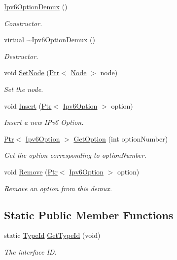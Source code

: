 \begin{DoxyCompactItemize}
\item 
\hyperlink{classns3_1_1Ipv6OptionDemux_a24eda18f711bb1626e93b85cad2894b3}{Ipv6\+Option\+Demux} ()
\begin{DoxyCompactList}\small\item\em Constructor. \end{DoxyCompactList}\item 
virtual \hyperlink{classns3_1_1Ipv6OptionDemux_a2fafb4a70d47e1aa7adf21932a611cb3}{$\sim$\+Ipv6\+Option\+Demux} ()
\begin{DoxyCompactList}\small\item\em Destructor. \end{DoxyCompactList}\item 
void \hyperlink{classns3_1_1Ipv6OptionDemux_a3a3c989fe7fb5f42b32ea435db753def}{Set\+Node} (\hyperlink{classns3_1_1Ptr}{Ptr}$<$ \hyperlink{classns3_1_1Node}{Node} $>$ node)
\begin{DoxyCompactList}\small\item\em Set the node. \end{DoxyCompactList}\item 
void \hyperlink{classns3_1_1Ipv6OptionDemux_a2e521d7d6f94ec7f486f433212543f62}{Insert} (\hyperlink{classns3_1_1Ptr}{Ptr}$<$ \hyperlink{classns3_1_1Ipv6Option}{Ipv6\+Option} $>$ option)
\begin{DoxyCompactList}\small\item\em Insert a new I\+Pv6 Option. \end{DoxyCompactList}\item 
\hyperlink{classns3_1_1Ptr}{Ptr}$<$ \hyperlink{classns3_1_1Ipv6Option}{Ipv6\+Option} $>$ \hyperlink{classns3_1_1Ipv6OptionDemux_ae7f858926a2c88165e4b4ce2975d12c6}{Get\+Option} (int option\+Number)
\begin{DoxyCompactList}\small\item\em Get the option corresponding to option\+Number. \end{DoxyCompactList}\item 
void \hyperlink{classns3_1_1Ipv6OptionDemux_aae6a6d75f141074047d169a2e342d938}{Remove} (\hyperlink{classns3_1_1Ptr}{Ptr}$<$ \hyperlink{classns3_1_1Ipv6Option}{Ipv6\+Option} $>$ option)
\begin{DoxyCompactList}\small\item\em Remove an option from this demux. \end{DoxyCompactList}\end{DoxyCompactItemize}
\subsection*{Static Public Member Functions}
\begin{DoxyCompactItemize}
\item 
static \hyperlink{classns3_1_1TypeId}{Type\+Id} \hyperlink{classns3_1_1Ipv6OptionDemux_a0708bf498965409e404d3e89b9331803}{Get\+Type\+Id} (void)
\begin{DoxyCompactList}\small\item\em The interface ID. \end{DoxyCompactList}\end{DoxyCompactItemize}
